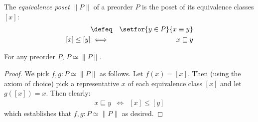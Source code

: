 \documentclass{article}
\newcommand{\ale}{\sqsubseteq}
\newcommand{\aeq}{\equiv}
\newcommand{\ordeq}{\simeq}
\newcommand{\eqposet}[1]{\ms{Eq}(#1)}
\renewcommand{\eqposet}[1]{\|{#1}\|}
\newcommand{\eqclass}[1]{[#1]}
\newcommand{\height}{\ms{height}}
\newcommand{\elemheight}[2]{\height(#2 : #1)}
\newcommand{\down}[2]{\mathop{\downarrow}(#2 : #1)}
\begin{document}

\begin{definition}
  The \emph{equivalence poset} $\eqposet{P}$ of a preorder $P$ is the poset of
  its equivalence classes $\eqclass{x}$:
  \begin{eqnarray*}
    \eqclass{x}  &\defeq&  \setfor{y \in P}{x \aeq y}\\
    \eqclass{x} \le \eqclass{y} &\iff& x \ale y
  \end{eqnarray*}
\end{definition}

\begin{theorem}
  For any preorder $P$, $P \ordeq \eqposet{P}$.
\end{theorem}
\begin{proof}
  We pick $f,g : P \ordeq \eqposet{P}$ as follows. Let $f(x) = \eqclass{x}$.
  Then (using the axiom of choice) pick a representative $x$ of each equivalence
  class $\eqclass{x}$ and let $g(\eqclass{x}) = x$. Then clearly:
  \begin{eqnarray*}
    x \ale y &\iff& \eqclass{x} \le \eqclass{y}
  \end{eqnarray*}
  which establishes that $f,g : P \ordeq \eqposet{P}$ as desired.
\end{proof}


\end{document}
